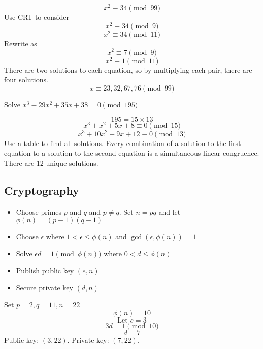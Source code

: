 \documentclass[english, 12pt]{article}
\begin{document}
\begin{exmp}
\[x^2 \equiv 34 \pmod{99} \]
Use CRT to consider 
\[x^2 \equiv 34 \pmod 9\]
\[x^2 \equiv 34 \pmod {11} \]
Rewrite as
 \[x^2 \equiv 7 \pmod 9\]
\[x^2 \equiv 1 \pmod {11} \]
There are two solutions to each equation, so by multiplying each pair, there are four solutions.
\[x \equiv 23,32,67,76 \pmod {99} \]
\end{exmp}
\begin{exmp}
Solve $x^3 - 29x^2 + 35x + 38 = 0 \pmod{195}$
\begin{sol}
\[ 195 = 15 \times 13 \]
\[x^3 + x^2 + 5x + 8 \equiv 0 \pmod{15} \]
\[ x^3 + 10x^2 + 9x +12 \equiv 0 \pmod{13} \]
Use a table to find all solutions. Every combination of a solution to the first equation to a solution to the second equation is a simultaneous linear congruence. There are 12 unique solutions.
\end{sol}
\end{exmp}
\subsection{Cryptography}
\begin{itemize}
\item Choose primes $p$ and $q$ and $p \neq q$. Set $n = pq$ and let $\phi(n) = (p-1)(q-1)$
\item Choose $\epsilon$ where $ 1 < \epsilon \leq \phi(n)$ and $\gcd(\epsilon, \phi(n)) = 1$
\item Solve $\epsilon d = 1 \pmod{\phi(n)}$ where $ 0 < d \leq \phi(n)$
\item Publish public key $(e,n)$
\item Secure private key $(d,n)$
\end{itemize}
\begin{exmp}
Set $p=2,q=11, n = 22$
\[ \phi(n) = 10 \]
\[\text{Let } e=3 \]
\[ 3d = 1 \pmod{10} \]
\[ d = 7 \]
Public key: $(3, 22)$. Private key: $(7,22)$.
\end{exmp}
\end{document}
